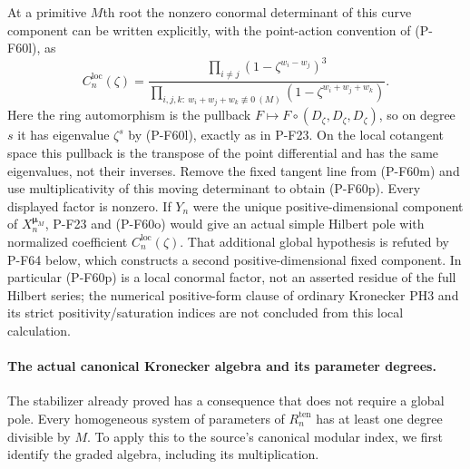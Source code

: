 At a primitive $M$th root the nonzero conormal
determinant of this curve component can be written
explicitly, with the point-action convention of
(P-F60l), as
\[
 C^{\mathrm{loc}}_n(\zeta)=
 \frac{\displaystyle\prod_{i\ne j}
            (1-\zeta^{w_i-w_j})^3}
      {\displaystyle\prod_{i,j,k:\ w_i+w_j+w_k\not\equiv0\ (M)}
            (1-\zeta^{w_i+w_j+w_k})}.
                                                        \tag{P-F60p}
\]
Here the ring automorphism is the pullback $F\mapsto
F\circ(D_\zeta,D_\zeta,D_\zeta)$, so on degree $s$
it has eigenvalue $\zeta^s$ by (P-F60l), exactly as
in P-F23.  On the local cotangent space this pullback
is the transpose of the point differential and has
the same eigenvalues, not their inverses.
Remove the fixed tangent line from (P-F60m) and use
multiplicativity of this moving determinant to obtain
(P-F60p).
Every displayed factor is nonzero.  If $Y_n$ were
the unique positive-dimensional component of
$X_n^{\boldsymbol\mu_M}$, P-F23 and (P-F60o) would
give an actual simple Hilbert pole with normalized
coefficient $C^{\mathrm{loc}}_n(\zeta)$.
That additional global hypothesis is refuted by P-F64 below,
which constructs a second positive-dimensional fixed component.
In particular (P-F60p) is a local conormal factor,
not an asserted residue of the full Hilbert series;
the numerical positive-form clause of ordinary Kronecker
PH3 and its strict positivity/saturation indices are not
concluded from this local calculation.

\paragraph{The actual canonical Kronecker algebra and its parameter degrees.}
The stabilizer already proved has a consequence that does
not require a global pole.  Every homogeneous system of
parameters of $R^{\mathrm{ten}}_n$ has at least one degree
divisible by $M$.  To apply this to the source's canonical
modular index, we first identify the graded algebra,
including its multiplication.

